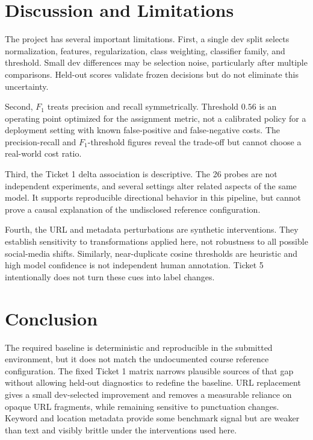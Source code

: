 \documentclass[10pt]{article}
\newcommand{\fscore}{\ensuremath{F_1}}
\begin{document}
\section{Discussion and Limitations}

The project has several important limitations. First, a single dev split selects normalization, features, regularization, class weighting, classifier family, and threshold. Small dev differences may be selection noise, particularly after multiple comparisons. Held-out scores validate frozen decisions but do not eliminate this uncertainty.

Second, \fscore{} treats precision and recall symmetrically. Threshold $0.56$ is an operating point optimized for the assignment metric, not a calibrated policy for a deployment setting with known false-positive and false-negative costs. The precision-recall and \fscore{}-threshold figures reveal the trade-off but cannot choose a real-world cost ratio.

Third, the Ticket 1 delta association is descriptive. The 26 probes are not independent experiments, and several settings alter related aspects of the same model. It supports reproducible directional behavior in this pipeline, but cannot prove a causal explanation of the undisclosed reference configuration.

Fourth, the URL and metadata perturbations are synthetic interventions. They establish sensitivity to transformations applied here, not robustness to all possible social-media shifts. Similarly, near-duplicate cosine thresholds are heuristic and high model confidence is not independent human annotation. Ticket 5 intentionally does not turn these cues into label changes.

\section{Conclusion}

The required baseline is deterministic and reproducible in the submitted environment, but it does not match the undocumented course reference configuration. The fixed Ticket 1 matrix narrows plausible sources of that gap without allowing held-out diagnostics to redefine the baseline. URL replacement gives a small dev-selected improvement and removes a measurable reliance on opaque URL fragments, while remaining sensitive to punctuation changes. Keyword and location metadata provide some benchmark signal but are weaker than text and visibly brittle under the interventions used here.
\end{document}
